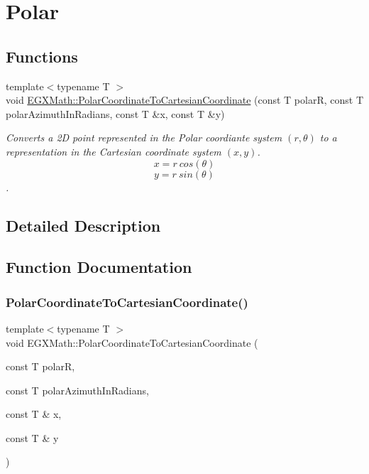 \hypertarget{group___e_g_x_math-_conversions-_coordinate_conversions-2_d-_polar}{}\section{Polar}
\label{group___e_g_x_math-_conversions-_coordinate_conversions-2_d-_polar}
\subsection*{Functions}
\begin{DoxyCompactItemize}
\item 
{\footnotesize template$<$typename T $>$ }\\void \mbox{\hyperlink{group___e_g_x_math-_conversions-_coordinate_conversions-2_d-_polar_ga189458efd604828d5825a8e8929845eb}{E\+G\+X\+Math\+::\+Polar\+Coordinate\+To\+Cartesian\+Coordinate}} (const T polarR, const T polar\+Azimuth\+In\+Radians, const T \&x, const T \&y)
\begin{DoxyCompactList}\small\item\em Converts a 2D point represented in the Polar coordiante system $(r,\theta)$ to a representation in the Cartesian coordinate system $(x,y)$. \[ x = r\ cos(\theta) \] \[ y = r\ sin(\theta) \]. \end{DoxyCompactList}\end{DoxyCompactItemize}


\subsection{Detailed Description}


\subsection{Function Documentation}
\mbox{\label{group___e_g_x_math-_conversions-_coordinate_conversions-2_d-_polar_ga189458efd604828d5825a8e8929845eb}} 
\subsubsection{\texorpdfstring{Polar\+Coordinate\+To\+Cartesian\+Coordinate()}{PolarCoordinateToCartesianCoordinate()}}
{\footnotesize\ttfamily template$<$typename T $>$ \\
void E\+G\+X\+Math\+::\+Polar\+Coordinate\+To\+Cartesian\+Coordinate (\begin{DoxyParamCaption}\item[{const T}]{polarR,  }\item[{const T}]{polar\+Azimuth\+In\+Radians,  }\item[{const T \&}]{x,  }\item[{const T \&}]{y }\end{DoxyParamCaption})}



